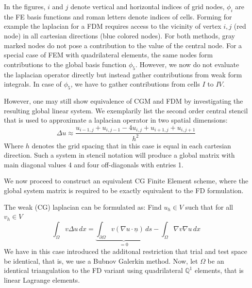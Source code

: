 \documentclass[sn-mathphys,Numbered]{sn-jnl}%
\theoremstyle{thmstyleone}%
\theoremstyle{thmstyletwo}%
\theoremstyle{thmstylethree}%
\begin{document}
In the figures, $i$ and $j$ denote vertical and horizontal indices of grid nodes, $\phi_i$ are the FE basis functions and roman letters denote indices of cells.
Forming for example the laplacian for a FDM requires access to the vicinity of vertex $i,j$ (red node) in all cartesian directions (blue colored nodes). For both methods, gray marked nodes do not pose a contribution to the value of the central node. For a special case of FEM with quadrilateral elements, the same nodes form contributions to the global basis function $\phi_5$. However, we now do not evaluate the laplacian operator directly but instead gather contributions from weak form integrals. In case of $\phi_5$, we have to gather contributions from cells $I$ to $IV$.

However, one may still show equivalence of CGM and FDM by investigating the resulting global linear system.
We exemplarily list the second order central stencil that is used to approximate a laplacian operator in two spatial dimensions:
\begin{equation}\label{eq:fd-laplacian}
    \Delta u \approx \frac{u_{i-1,j}+u_{i,j-1}-4u_{i,j}+u_{i+1,j}+u_{i,j+1}}{h^2}
\end{equation}
Where $h$ denotes the grid spacing that in this case is equal in each cartesian direction.
Such a system in stencil notation will produce a global matrix with main diagonal values 4 and four off-diagonals with entries 1.

We now proceed to construct an equivalent CG Finite Element scheme, where the global system matrix is required to be exactly equivalent to the FD formulation.

The weak (CG) laplacian can be formulated as: Find $u_h \in V$ such that for all $v_h \in V$
\begin{equation}
    \int_\Omega v \Delta u \,dx = \underbrace{\int_{\partial\Omega} v (\nabla u \cdot \underline{n}) \,ds}_{=0} - \int_\Omega \nabla v \nabla u \,dx
\end{equation}
We have in this case introduced the additonal restriction that trial and test space be identical, that is, we use a Bubnov Galerkin method.
Now, let $\Omega$ be an identical triangulation to the FD variant using quadrilateral $\mathbb{Q}^1$ elements, that is linear Lagrange elements.
\end{document}

